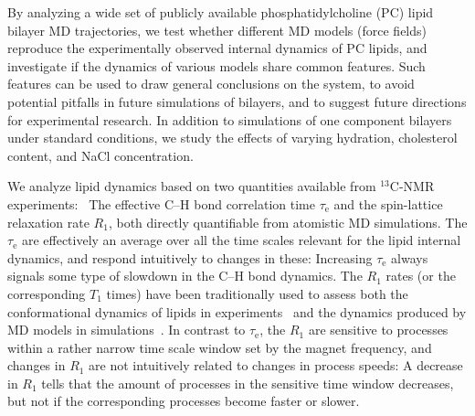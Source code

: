 \documentclass[journal=jpcbfk,manuscript=article,layout=twocolumn]{achemso}
\begin{document}
%
By analyzing a wide set of publicly available phosphatidylcholine (PC) lipid bilayer MD trajectories, we test whether different MD models (force fields) reproduce the experimentally observed internal dynamics of PC lipids, and investigate if the dynamics of various models share common features. Such features can be used to draw general conclusions on the system, to avoid potential pitfalls in future simulations of bilayers, and to suggest future directions for experimental research.  In addition to simulations of one component bilayers under standard conditions, we study the effects of varying hydration, cholesterol content, and NaCl concentration.

We analyze lipid dynamics based on two quantities available from $^{13}$C-NMR experiments:~\cite{ferreira15,pham15,Volke:1995a}
The effective C--H bond correlation time $\tau_\mathrm{e}$ and
the spin-lattice relaxation rate $R_{1}$,
both %
directly quantifiable from atomistic MD simulations.
The
$\tau_\mathrm e$ are effectively an average over all the time scales relevant for the lipid internal dynamics,
and respond intuitively to changes in these: 
Increasing $\tau_\mathrm{e}$ always signals some type of slowdown in the C--H bond dynamics. %
\cite{ferreira15}
%
The $R_{1}$ rates (or the corresponding $T_{1}$ times) have been traditionally used to assess both the conformational dynamics of lipids in experiments~\cite{feller02,eldho03,wohlert06,klauda08,leftin11} and the dynamics produced by MD models in simulations~\cite{feller02,wohlert06,klauda08,klauda08II}.
In contrast to $\tau_\mathrm e$, the $R_1$ are sensitive to processes within a rather narrow time scale window set by the magnet frequency, and changes in $R_1$ are not intuitively related to changes in process speeds: A decrease in $R_1$ tells that the amount of processes in the sensitive time window decreases, but not if the corresponding processes become faster or slower.
\end{document}
